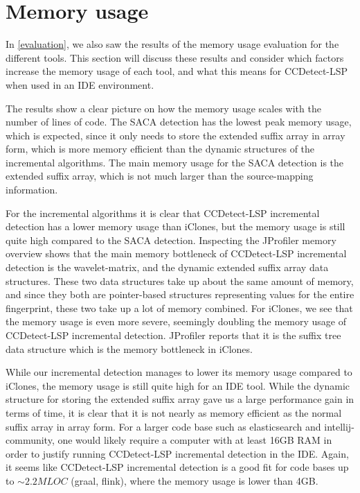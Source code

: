 \section{Memory usage}

In \cref{evaluation}, we also saw the results of the memory usage evaluation for the
different tools. This section will discuss these results and consider which factors
increase the memory usage of each tool, and what this means for CCDetect-LSP when used in
an IDE environment.

The results show a clear picture on how the memory usage scales with the number of lines
of code. The SACA detection has the lowest peak memory usage, which is expected, since it
only needs to store the extended suffix array in array form, which is more memory
efficient than the dynamic structures of the incremental algorithms. The main memory usage
for the SACA detection is the extended suffix array, which is not much larger than the
source-mapping information.

For the incremental algorithms it is clear that CCDetect-LSP incremental detection has a
lower memory usage than iClones, but the memory usage is still quite high compared to the
SACA detection. Inspecting the JProfiler memory overview shows that the main memory
bottleneck of CCDetect-LSP incremental detection is the wavelet-matrix, and the dynamic
extended suffix array data structures. These two data structures take up about the same
amount of memory, and since they both are pointer-based structures representing values for
the entire fingerprint, these two take up a lot of memory combined. For iClones, we see
that the memory usage is even more severe, seemingly doubling the memory usage of
CCDetect-LSP incremental detection. JProfiler reports that it is the suffix tree data
structure which is the memory bottleneck in iClones. 

While our incremental detection manages to lower its memory usage compared to iClones, the
memory usage is still quite high for an IDE tool. While the dynamic structure for storing
the extended suffix array gave us a large performance gain in terms of time, it is clear
that it is not nearly as memory efficient as the normal suffix array in array form. For a
larger code base such as elasticsearch and intellij-community, one would likely require a
computer with at least 16GB RAM in order to justify running CCDetect-LSP incremental
detection in the IDE. Again, it seems like CCDetect-LSP incremental detection is a good
fit for code bases up to ${\sim}2.2MLOC$ (graal, flink), where the memory usage is lower
than 4GB.

